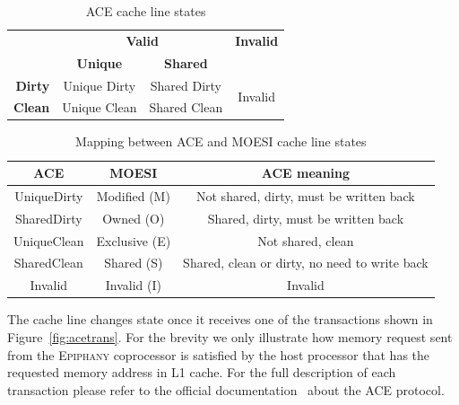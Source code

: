 \documentclass{hitec}
\begin{document}
\begin{table}
\begin{center}
\begin{tabular}{r|c|c|c|}
\multicolumn{1}{c}{} & \multicolumn{2}{c}{\textbf{Valid}} & \multicolumn{1}{c}{\textbf{Invalid}} \\
\multicolumn{1}{c}{} & \multicolumn{1}{c}{\textbf{Unique}} & \multicolumn{1}{c}{\textbf{Shared}} & \multicolumn{1}{c}{} \\
\cline{2-4}
\textbf{Dirty} & Unique Dirty & Shared Dirty & \multirow{2}{*}{Invalid} \\
\cline{2-3}
\textbf{Clean} & Unique Clean & Shared Clean &  \\
\cline{2-4}
\end{tabular}
\caption{\textsc{ACE} cache line states}
\label{tab:acestates}
\end{center}
\end{table}

\begin{table}
\begin{center}
\begin{tabular}{c|c|c}
\textbf{ACE} & \textbf{MOESI} & \textbf{ACE meaning} \\
\hline
UniqueDirty & Modified (M) & Not shared, dirty, must be written back \\
SharedDirty & Owned (O) & Shared, dirty, must be written back \\
UniqueClean & Exclusive (E) & Not shared, clean \\
SharedClean & Shared (S) & Shared, clean or dirty, no need to write back \\
Invalid & Invalid (I) & Invalid \\
\end{tabular}
\caption{Mapping between \textsc{ACE} and MOESI cache line states}
\label{tab:acemap}
\end{center}
\end{table}

The cache line changes state once it receives one of the transactions
shown in Figure~\ref{fig:acetrans}. For the brevity we only illustrate how
memory request sent from the \textsc{Epiphany} coprocessor is
satisfied by the host processor that has the requested memory address
in L1 cache. For the full description of each transaction please refer
to the official documentation~\cite{acedoc, acedoc2} about the
\textsc{ACE} protocol. 
\end{document}

